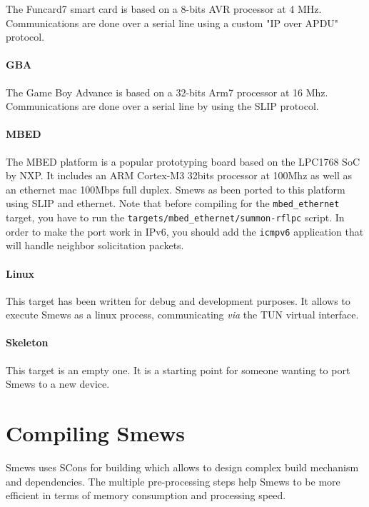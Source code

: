\documentclass{report}
\begin{document}
The Funcard7 smart card is based on a 8-bits AVR processor at 4 MHz. Communications are done over a serial line using a custom "IP over APDU" protocol.

\paragraph{GBA}

The Game Boy Advance is based on a 32-bits Arm7 processor at 16 Mhz. Communications are done over a serial line by using the SLIP protocol.

\paragraph{MBED}

The MBED platform is a popular prototyping board based on the LPC1768 SoC by NXP. It includes an ARM Cortex-M3 32bits processor at 100Mhz as well as an ethernet mac 100Mbps full duplex. Smews as been ported to this platform using SLIP and ethernet. Note that before compiling for the \verb+mbed_ethernet+ target, you have to run the \verb+targets/mbed_ethernet/summon-rflpc+ script. In order to make the port work in IPv6, you should add the \verb!icmpv6! application that will handle neighbor solicitation packets.

\paragraph{Linux}

This target has been written for debug and development purposes. It allows to execute Smews as a linux process, communicating {\it via} the TUN virtual interface.

\paragraph{Skeleton}

This target is an empty one. It is a starting point for someone wanting to port Smews to a new device.

\section{Compiling Smews}
\label{sec:compile}

Smews uses SCons for building which allows to design complex build mechanism and dependencies. The multiple pre-processing steps help Smews to be more efficient in terms of memory consumption and processing speed.
\end{document}
